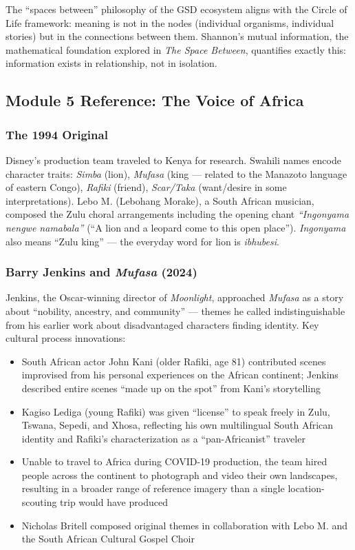\documentclass[11pt,letterpaper]{article}
\begin{document}
The ``spaces between'' philosophy of the GSD ecosystem aligns with the Circle of Life framework: meaning is not in the nodes (individual organisms, individual stories) but in the connections between them. Shannon's mutual information, the mathematical foundation explored in \textit{The Space Between}, quantifies exactly this: information exists in relationship, not in isolation.

\subsection{Module 5 Reference: The Voice of Africa}

\subsubsection{The 1994 Original}

Disney's production team traveled to Kenya for research. Swahili names encode character traits: \textit{Simba} (lion), \textit{Mufasa} (king --- related to the Manazoto language of eastern Congo), \textit{Rafiki} (friend), \textit{Scar/Taka} (want/desire in some interpretations). Lebo M. (Lebohang Morake), a South African musician, composed the Zulu choral arrangements including the opening chant \textit{``Ingonyama nengwe namabala''} (``A lion and a leopard come to this open place''). \textit{Ingonyama} also means ``Zulu king'' --- the everyday word for lion is \textit{ibhubesi}.

\subsubsection{Barry Jenkins and \textit{Mufasa} (2024)}

Jenkins, the Oscar-winning director of \textit{Moonlight}, approached \textit{Mufasa} as a story about ``nobility, ancestry, and community'' --- themes he called indistinguishable from his earlier work about disadvantaged characters finding identity. Key cultural process innovations:

\begin{itemize}[leftmargin=2em]
  \item South African actor John Kani (older Rafiki, age 81) contributed scenes improvised from his personal experiences on the African continent; Jenkins described entire scenes ``made up on the spot'' from Kani's storytelling
  \item Kagiso Lediga (young Rafiki) was given ``license'' to speak freely in Zulu, Tswana, Sepedi, and Xhosa, reflecting his own multilingual South African identity and Rafiki's characterization as a ``pan-Africanist'' traveler
  \item Unable to travel to Africa during COVID-19 production, the team hired people across the continent to photograph and video their own landscapes, resulting in a broader range of reference imagery than a single location-scouting trip would have produced
  \item Nicholas Britell composed original themes in collaboration with Lebo M. and the South African Cultural Gospel Choir
\end{itemize}
\end{document}

